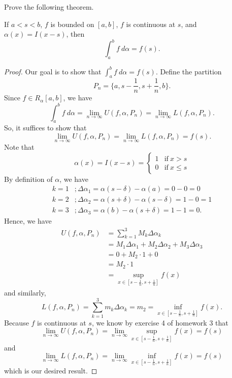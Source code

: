 \documentclass[a4paper]{article}
\begin{document}
\begin{problem}
    Prove the following theorem.
\end{problem}

\begin{theorem}
    If \( a < s < b  \), \( f   \) is bounded on \( [a,b] \), \( f  \) is continuous at \( s  \), and \( \alpha(x) = I (x-s) \), then
    \[  \int_{ a }^{ b } f \ d \alpha = f(s). \]
\end{theorem}
\begin{proof}
    Our goal is to show that \( \int_{ a }^{ b } f  \ d \alpha = f(s) \).     Define the partition
\[  {P}_{n} = \Big\{ a , s - \frac{ 1 }{ n } , s + \frac{ 1 }{ n } , b \Big\}.  \]
Since \( f \in R_{\alpha}[a,b] \), we have 
\[  \int_{ a }^{ b } f \ d \alpha = \lim_{ n \to \infty  } U(f, \alpha, {P}_{n}) = \lim_{ n \to \infty  }  L(f, \alpha, {P}_{n}). \tag{*} \]
    So, it suffices to show that 
    \[  \lim_{ n \to \infty  }  U(f, \alpha, {P}_{n}) = \lim_{ n \to \infty  }  L(f, \alpha, {P}_{n}) =  f(s). \]
Note that 
\[  \alpha(x) = I(x-s) = 
\begin{cases}
    1 &\text{if} \ x > s \\
    0 &\text{if} \ x \leq s 
\end{cases}  \]
By definition of \( \alpha \), we have 
\begin{align*}
    k = 1 &; \Delta {\alpha}_{1} = \alpha(s- \delta) - \alpha(a) = 0 - 0 = 0  \\
    k = 2 &; \Delta \alpha_2 = \alpha(s + \delta) - \alpha(s - \delta) = 1 - 0 =  1 \\
    k = 3 &; \Delta {\alpha}_{3} =  \alpha(b) - \alpha(s+\delta) = 1- 1 = 0. 
\end{align*}
Hence, we have 
\begin{align*} U(f, \alpha, {P}_{n}) &= \sum_{ k=1  }^{ 3  } {M}_{k} \Delta {\alpha}_{k}  \\
    &= {M}_{1} \Delta {\alpha}_{1} + {M}_{2} \Delta {\alpha}_{2} + {M}_{3} \Delta {\alpha}_{3} \\ 
                          &= 0 + {M}_{2} \cdot 1 + 0   \\
                          &= {M}_{2} \cdot 1 \\
                          &= \sup_{x \in [s - \frac{ 1 }{ n } , s + \frac{ 1 }{ n } ]} f(x)
\end{align*} 
and similarly, 
\[  L(f, \alpha, {P}_{n})  = \sum_{ k=1  }^{ 3  } {m}_{k} \Delta {\alpha}_{k} = {m}_{2} = \inf_{x \in [s - \frac{ 1 }{ n } , s + \frac{ 1 }{ n } ]} f(x). \]
Because \( f  \) is continuous at \( s  \), we know by exercise 4 of homework 3 that
\[  \lim_{ n \to \infty  }  U(f, \alpha, {P}_{n}) = \lim_{ n \to \infty  }  \sup_{x \in [s - \frac{ 1 }{ n }  , s  + \frac{ 1 }{ n } ]} f(x) = f(s) \]
and 
\[  \lim_{ n \to \infty  } L(f,\alpha, {P}_{n}) = \lim_{ n \to \infty  } \inf_{x \in [s - \frac{ 1 }{ n } , s+ \frac{ 1 }{ n } ]} f(x) = f(s) \]
which is our desired result.
\end{proof} 
\end{document}
